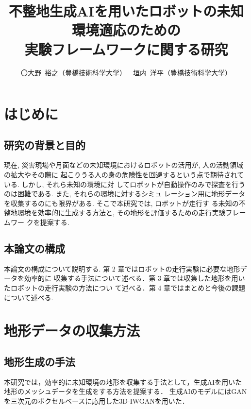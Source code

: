 \documentclass[twocolumn]{jarticle} %
\begin{document}
\title{不整地生成AIを用いたロボットの未知環境適応のための\\実験フレームワークに関する研究}
\author{〇大野\ 裕之（豊橋技術科学大学）\ \ 垣内\ 洋平（豊橋技術科学大学）}
\setlength{\baselineskip}{4.4mm}	%
\maketitle
\thispagestyle{empty}
\pagestyle{empty}

\section{はじめに}
\subsection{研究の背景と目的}
現在, 災害現場や月面などの未知環境におけるロボットの活用が, 人の活動領域の拡大やその際に
起こりうる人の身の危険性を回避するという点で期待されている. しかし, それら未知の環境に対
してロボットが自動操作のみで探査を行うのは困難である. \cite{bunken1} また, それらの環境に対するシミュ
レーション用に地形データを収集するのにも限界がある. \cite{bunken2} そこで本研究では, ロボットが走行す
る未知の不整地環境を効率的に生成する方法と, その地形を評価するための走行実験フレームワー
クを提案する.

\subsection{本論文の構成}
本論文の構成について説明する. 第 2 章ではロボットの走行実験に必要な地形データを効率的に
収集する手法について述べる．第 3 章では収集した地形を用いたロボットの走行実験の方法につい
て述べる．第 4 章ではまとめと今後の課題について述べる.


\section{地形データの収集方法}
\subsection{地形生成の手法}
本研究では，効率的に未知環境の地形を収集する手法として，生成AIを用いた地形のメッシュデータを生成をする方法を提案する．
生成AIのモデルにはGANを三次元のボクセルベースに応用した3D-IWGANを用いた．\cite{bunken3}
\end{document}
